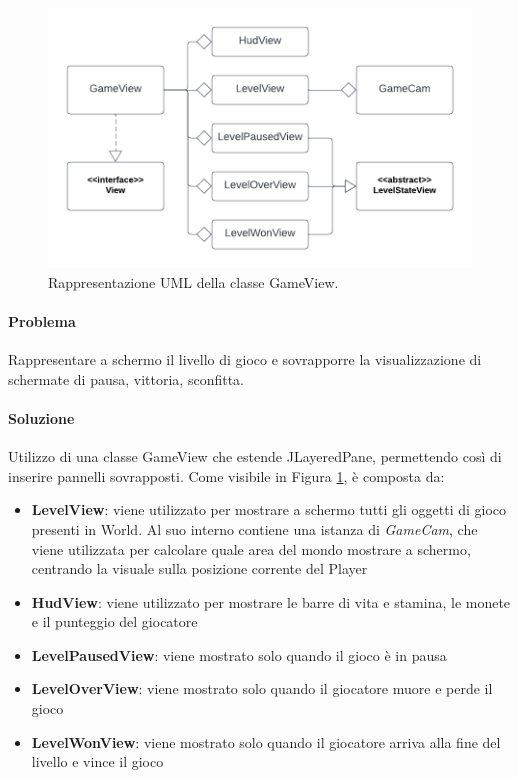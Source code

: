 \documentclass[a4paper,12pt]{report}
\begin{document}
    \begin{figure}[H]
        \centering{}
        \includegraphics[scale=0.8] {img/view.png}
        \caption{Rappresentazione UML della classe GameView.}
        \label{img:view}
    \end{figure}

    \paragraph{Problema} Rappresentare a schermo il livello di gioco e sovrapporre la visualizzazione di schermate di pausa, vittoria, sconfitta.

    \paragraph{Soluzione} Utilizzo di una classe GameView che estende JLayeredPane, permettendo così di inserire pannelli sovrapposti. Come visibile in Figura \ref{img:view}, è composta da:

    \begin{itemize}
        \item \textbf{LevelView}: viene utilizzato per mostrare a schermo tutti gli oggetti di gioco presenti in World. Al suo interno contiene una istanza di \emph{GameCam}, che viene utilizzata per calcolare quale area del mondo mostrare a schermo, centrando la visuale sulla posizione corrente del Player
        \item \textbf{HudView}: viene utilizzato per mostrare le barre di vita e stamina, le monete e il punteggio del giocatore
        \item \textbf{LevelPausedView}: viene mostrato solo quando il gioco è in pausa
        \item \textbf{LevelOverView}: viene mostrato solo quando il giocatore muore e perde il gioco
        \item \textbf{LevelWonView}: viene mostrato solo quando il giocatore arriva alla fine del livello e vince il gioco
    \end{itemize}
\end{document}

